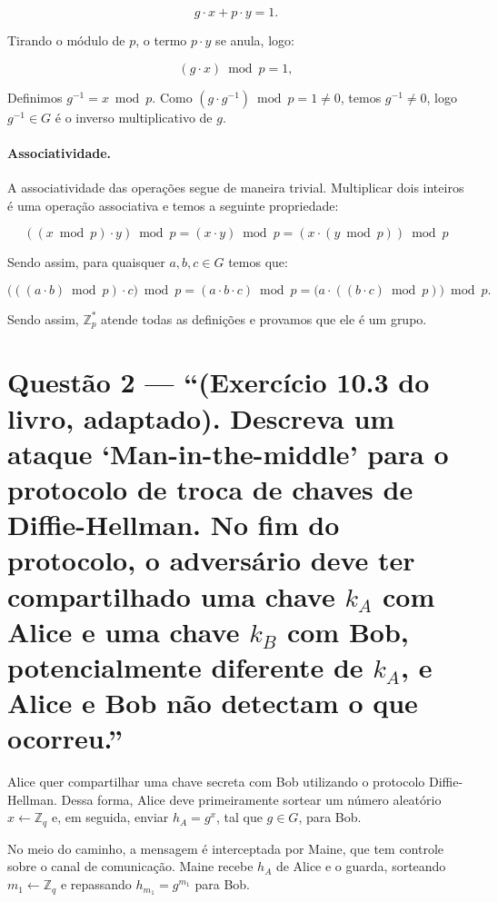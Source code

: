 \documentclass[11pt,a4paper]{article}
\newcommand{\Z}{\mathbb{Z}}
\begin{document}
    \[
        g \cdot x + p \cdot y = 1.
    \]

    Tirando o módulo de $p$, o termo $p \cdot y$ se anula, logo:

    \[
        (g \cdot x) \bmod p = 1,
    \]

    Definimos $g^{-1} = x \bmod p$.
    Como $(g \cdot g^{-1}) \bmod p = 1 \neq 0$, temos $g^{-1} \neq 0$, logo $g^{-1} \in G$ é o
    inverso multiplicativo de $g$.

    \paragraph{Associatividade.} A associatividade das operações segue de maneira trivial.
    Multiplicar dois inteiros é uma operação associativa e temos a seguinte propriedade:

    \[
        ((x \bmod p) \cdot y) \bmod p = (x \cdot y) \bmod p = (x \cdot (y \bmod p)) \bmod p
    \]

    Sendo assim, para quaisquer $a, b, c \in G$ temos que:

    \[
        \bigl(((a \cdot b) \bmod p) \cdot c\bigr) \bmod p
        = (a \cdot b \cdot c) \bmod p
        = \bigl(a \cdot ((b \cdot c) \bmod p)\bigr) \bmod p.
    \]


    Sendo assim, $\Z_p^*$ atende todas as definições e provamos que ele é um grupo.

    \clearpage

    \section*{Questão 2 --- ``(Exercício 10.3 do livro, adaptado). Descreva um ataque
    `Man-in-the-middle' para o protocolo de troca de chaves de Diffie-Hellman. No fim
    do protocolo, o adversário deve ter compartilhado uma chave $k_A$ com Alice e uma
    chave $k_B$ com Bob, potencialmente diferente de $k_A$, e Alice e Bob não
    detectam o que ocorreu.''}

    Alice quer compartilhar uma chave secreta com Bob utilizando o protocolo Diffie-Hellman.
    Dessa forma, Alice deve primeiramente sortear um número aleatório $x \leftarrow \Z_q$ e, em seguida,
    enviar $h_A = g^x$, tal que $g \in G$, para Bob.

    No meio do caminho, a mensagem é interceptada por Maine, que tem controle sobre o canal de comunicação.
    Maine recebe $h_A$ de Alice e o guarda, sorteando $m_1 \leftarrow \Z_q$ e repassando $h_{m_1} = g^{m_1}$ para Bob.
\end{document}
